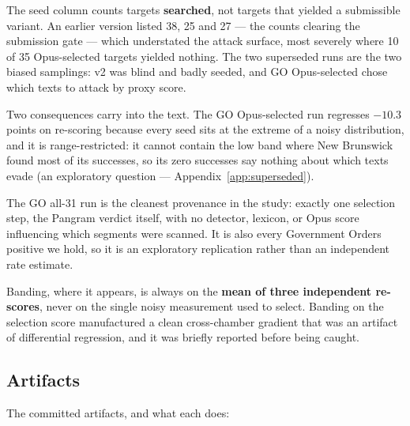 The seed column counts targets \textbf{searched}, not targets that yielded a
submissible variant. An earlier version listed 38, 25 and 27 --- the counts
clearing the submission gate --- which understated the attack surface, most
severely where 10 of 35 Opus-selected targets yielded nothing. The two
superseded runs are the two biased samplings: v2 was blind and badly seeded,
and GO Opus-selected chose which texts to attack by proxy score.

Two consequences carry into the text. The GO Opus-selected run regresses \(-10.3\)
points on re-scoring because every seed sits at the extreme of a noisy
distribution, and it is range-restricted: it cannot contain the low band where
New Brunswick found most of its successes, so its zero successes say nothing
about which texts evade (an exploratory question --- Appendix~\ref{app:superseded}).

The GO all-31 run is the cleanest provenance in the study: exactly one
selection step, the Pangram verdict itself, with no detector, lexicon, or Opus
score influencing which segments were scanned. It is also every Government
Orders positive we hold, so it is an exploratory replication rather than an
independent rate estimate.

Banding, where it appears, is always on the \textbf{mean of three independent
re-scores}, never on the single noisy measurement used to select. Banding on
the selection score manufactured a clean cross-chamber gradient that was an
artifact of differential regression, and it was briefly reported before being
caught.

\subsection{Artifacts}\label{sec:artifacts}

The committed artifacts, and what each does:

